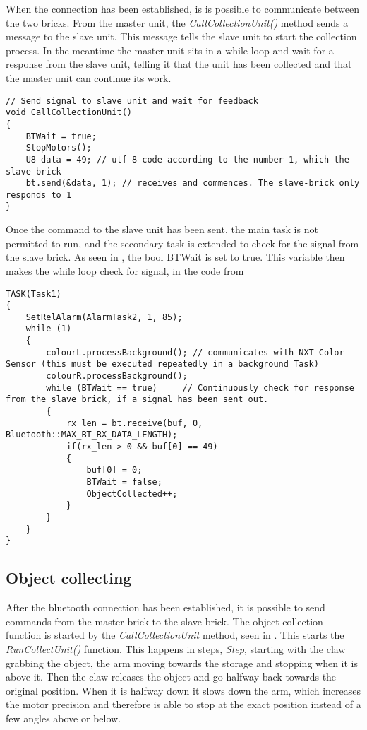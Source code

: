 When the connection has been established, is is possible to communicate between the two bricks. From the master unit, the \emph{CallCollectionUnit()} method sends a message to the slave unit. This message tells the slave unit to start the collection process. In the meantime the master unit sits in a while loop and wait for a response from the slave unit, telling it that the unit has been collected and that the master unit can continue its work.

\begin{lstlisting}[caption= Send a message from the master unit to the slave unit, label=lst:callcollectionunit]
// Send signal to slave unit and wait for feedback
void CallCollectionUnit()
{
	BTWait = true;
	StopMotors();
	U8 data = 49; // utf-8 code according to the number 1, which the slave-brick
	bt.send(&data, 1); // receives and commences. The slave-brick only responds to 1
}
\end{lstlisting}

Once the command to the slave unit has been sent, the main task is not permitted to run, and the secondary task is extended to check for the signal from the slave brick. As seen in , the bool BTWait is set to true. This variable then makes the while loop check for signal, in the code from 

\begin{lstlisting}[caption= Secondary task and the check for signal from the slave brick, label=lst:secondarytask]
TASK(Task1)
{
	SetRelAlarm(AlarmTask2, 1, 85);
	while (1)
	{
		colourL.processBackground(); // communicates with NXT Color Sensor (this must be executed repeatedly in a background Task)
		colourR.processBackground();
		while (BTWait == true)     // Continuously check for response from the slave brick, if a signal has been sent out. 
		{
			rx_len = bt.receive(buf, 0, Bluetooth::MAX_BT_RX_DATA_LENGTH);
			if(rx_len > 0 && buf[0] == 49)
			{
				buf[0] = 0;
				BTWait = false;
				ObjectCollected++;
			}
		}
	}
}
\end{lstlisting}


\subsection{Object collecting}
After the bluetooth connection has been established, it is possible to send commands from the master brick to the slave brick. The object collection function is started by the \emph{CallCollectionUnit} method, seen in . This starts the \emph{RunCollectUnit()} function. This happens in steps, \emph{Step}, starting with the claw grabbing the object, the arm moving towards the storage and stopping when it is above it. Then the claw releases the object and go halfway back towards the original position. When it is halfway down it slows down the arm, which increases the motor precision and therefore is able to stop at the exact position instead of a few angles above or below. 

